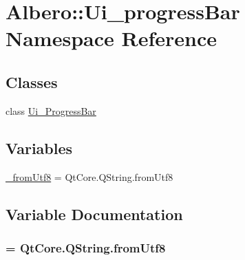 \hypertarget{namespaceAlbero_1_1Ui__progressBar}{
\section{Albero::Ui\_\-progressBar Namespace Reference}
\label{namespaceAlbero_1_1Ui__progressBar}
}
\subsection*{Classes}
\begin{DoxyCompactItemize}
\item 
class \hyperlink{classAlbero_1_1Ui__progressBar_1_1Ui__ProgressBar}{Ui\_\-ProgressBar}
\end{DoxyCompactItemize}
\subsection*{Variables}
\begin{DoxyCompactItemize}
\item 
\hyperlink{namespaceAlbero_1_1Ui__progressBar_ae680e70a240362bce7df6d4bc4de2748}{\_\-fromUtf8} = QtCore.QString.fromUtf8
\end{DoxyCompactItemize}


\subsection{Variable Documentation}
\hypertarget{namespaceAlbero_1_1Ui__progressBar_ae680e70a240362bce7df6d4bc4de2748}{
\subsubsection[{\_\-fromUtf8}]{ = QtCore.QString.fromUtf8}}
\label{namespaceAlbero_1_1Ui__progressBar_ae680e70a240362bce7df6d4bc4de2748}
